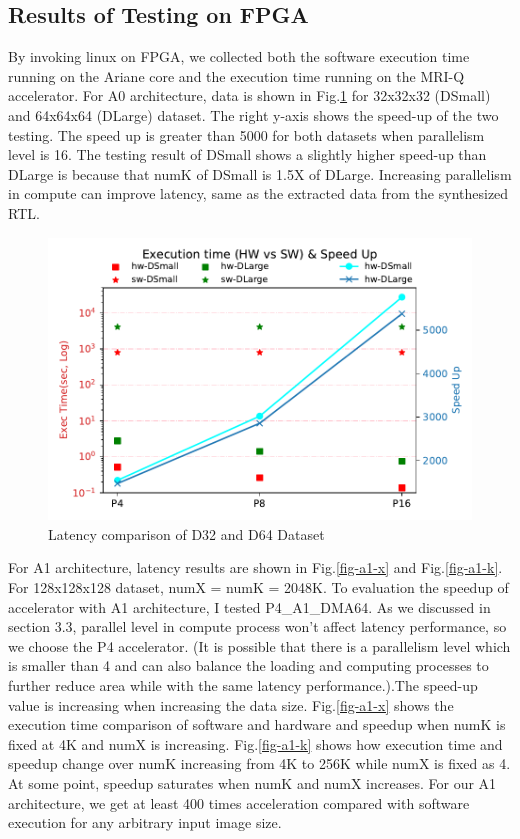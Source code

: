 \subsection{Results of Testing on FPGA}

By invoking linux on FPGA, we collected both the software execution time running
on the Ariane core and the execution time running on the MRI-Q accelerator. For
A0 architecture, data is shown in Fig.\ref{fig-d32-64} for 32x32x32 (DSmall) and
64x64x64 (DLarge) dataset.  The right y-axis shows the speed-up of the two
testing. The speed up is greater than 5000 for both datasets when parallelism
level is 16. The testing result of DSmall shows a slightly higher speed-up than DLarge
is because that numK of DSmall is 1.5X of DLarge. Increasing parallelism in compute
can improve latency, same as the extracted data from the synthesized RTL.\\

\begin{figure}[h!]
    \centering
    \includegraphics[width=\columnwidth]{figures/a0-both}
    \caption{Latency comparison of D32 and D64 Dataset}
    \label{fig-d32-64}
\end{figure}

For A1 architecture, latency results are shown in Fig.\ref{fig-a1-x} and
Fig.\ref{fig-a1-k}. For 128x128x128 dataset, numX = numK = 2048K. To evaluation
the speedup of accelerator with A1 architecture, I tested P4\_A1\_DMA64. As we
discussed in section 3.3, parallel level in compute process won't affect latency
performance, so we choose the P4 accelerator. (It is possible that there is a
parallelism level which is smaller than 4 and can also balance the loading and
computing processes to further reduce area while with the same latency
performance.).The speed-up value is increasing when increasing the data
size. Fig.\ref{fig-a1-x} shows the execution time comparison of software and
hardware and speedup when numK is fixed at 4K and numX is
increasing. Fig.\ref{fig-a1-k} shows how execution time and speedup change over
numK increasing from 4K to 256K while numX is fixed as 4.  At some point,
speedup saturates when numK and numX increases. For our A1 architecture, we get
at least 400 times acceleration compared with software execution for any
arbitrary input image size.\\

